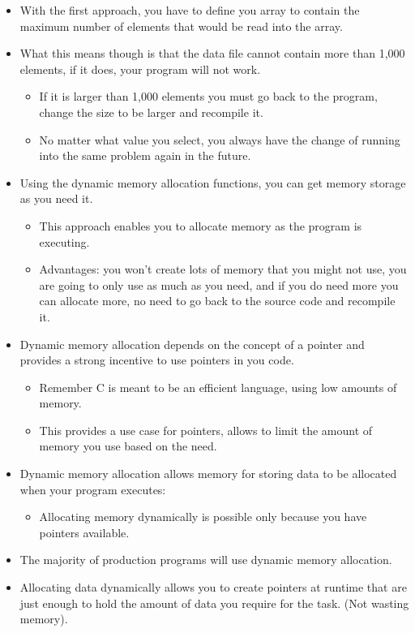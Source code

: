 \begin{itemize}
    \item With the first approach, you have to define you array to contain the maximum number of elements that would be read into the array. 
    
    \item What this means though is that the data file cannot contain more than 1,000 elements, if it does, your program will not work. 
        \begin{itemize}
            \item If it is larger than 1,000 elements you must go back to the program, change the size to be larger and recompile it. 
            \item No matter what value you select, you always have the change of running into the same problem again in the future. 
        \end{itemize}
    
    \item Using the dynamic memory allocation functions, you can get memory storage as you need it.
        \begin{itemize}
            \item This approach enables you to allocate memory as the program is executing. 
            \item Advantages: you won't create lots of memory that you might not use, you are going to only use as much as you need, and if you do need more you can allocate more, no need to go back to the source code and recompile it. 
        \end{itemize}
    
    \item Dynamic memory allocation depends on  the concept of a pointer and provides a strong incentive to use pointers in you code.
        \begin{itemize}
            \item Remember C is meant to be an efficient language, using low amounts of memory. 
            \item This provides a use case for pointers, allows to limit the amount of memory you use based on the need.
        \end{itemize}
    
    \item  Dynamic memory allocation allows memory for storing data to be allocated when your program executes: 
        \begin{itemize}
            \item Allocating memory dynamically is possible only because you have pointers available. 
        \end{itemize}
    
    \item The majority of production programs will use dynamic memory allocation. 
    \item Allocating data dynamically allows you to create pointers at runtime that are just enough to hold the amount of data you require for the task. (Not wasting memory).
\end{itemize}

